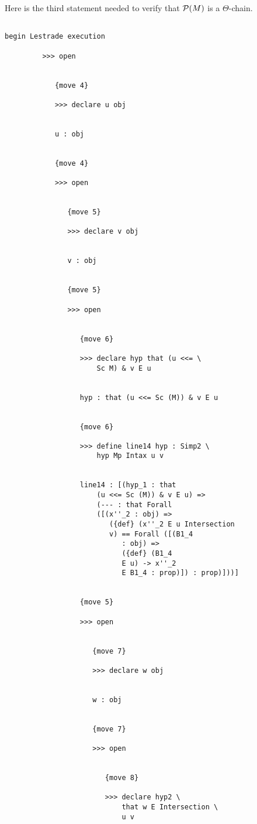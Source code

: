 \documentclass[12pt]{article}
\begin{document}
Here is the third statement needed to verify that ${\cal P}(M)$ is a $\Theta$-chain.

\begin{verbatim}

begin Lestrade execution

         >>> open


            {move 4}

            >>> declare u obj


            u : obj


            {move 4}

            >>> open


               {move 5}

               >>> declare v obj


               v : obj


               {move 5}

               >>> open


                  {move 6}

                  >>> declare hyp that (u <<= \
                      Sc M) & v E u


                  hyp : that (u <<= Sc (M)) & v E u


                  {move 6}

                  >>> define line14 hyp : Simp2 \
                      hyp Mp Intax u v


                  line14 : [(hyp_1 : that 
                      (u <<= Sc (M)) & v E u) => 
                      (--- : that Forall 
                      ([(x''_2 : obj) => 
                         ({def} (x''_2 E u Intersection 
                         v) == Forall ([(B1_4 
                            : obj) => 
                            ({def} (B1_4 
                            E u) -> x''_2 
                            E B1_4 : prop)]) : prop)]))]


                  {move 5}

                  >>> open


                     {move 7}

                     >>> declare w obj


                     w : obj


                     {move 7}

                     >>> open


                        {move 8}

                        >>> declare hyp2 \
                            that w E Intersection \
                            u v



\end{verbatim}
\end{document}

